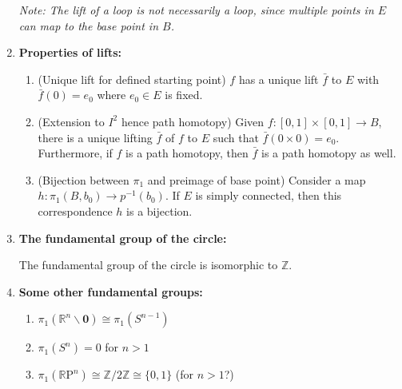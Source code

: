 \documentclass[letterpaper, 12pt]{article}
\newcommand{\RR}{\mathbb{R}}
\newcommand{\ZZ}{\mathbb{Z}}
\begin{document}
\begin{enumerate}[resume]
                \textit{Note: The lift of a loop is not necessarily a loop, since multiple points in $E$ can map to the base point in $B$.}
            \item \textbf{Properties of lifts:}
                \begin{enumerate}
                \item (Unique lift for defined starting point) $f$ has a unique lift $\bar f$ to $E$ with $\bar f(0) = e_0$ where $e_0\in E$ is fixed. %
                \item (Extension to $I^2$ hence path homotopy) Given $f:[0,1]\times [0,1]\to B$, there is a unique lifting $\bar f$ of $f$ to $E$ such that $\bar f(0\times 0) = e_0$. Furthermore, if $f$ is a path homotopy, then $\bar f$ is a path homotopy as well.
                \item (Bijection between $\pi_1$ and preimage of base point) Consider a map $h : \pi_1(B, b_0) \to p^{-1}(b_0)$. If $E$ is simply connected, then this correspondence $h$ is a bijection.
                \end{enumerate}
            \item \textbf{The fundamental group of the circle:}

                The fundamental group of the circle is isomorphic to $\ZZ$.

            \item \textbf{Some other fundamental groups:}
                \begin{enumerate}
                \item $\pi_1(\RR^n \smallsetminus \mathbf{0}) \cong \pi_1(S^{n-1})$
                \item $\pi_1(S^n) = 0$ for $n > 1$
                \item $\pi_1(\RR\mathrm{P}^n) \cong \ZZ/2\ZZ \cong \{0,1\}$ (for $n > 1$?) %
                \end{enumerate}
            \end{enumerate}
\end{document}
